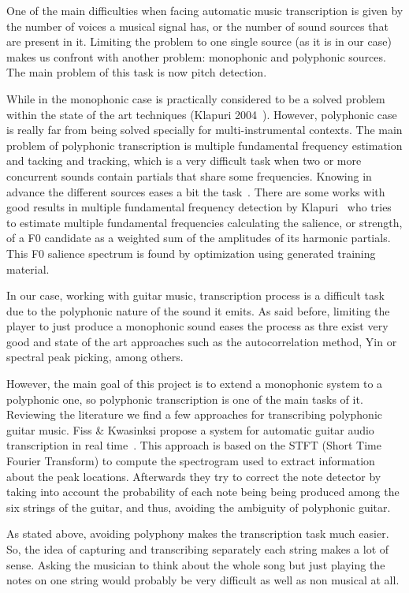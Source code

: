 One of the main difficulties when facing automatic music transcription is given by the number of voices a musical signal has, or the number of sound sources that are present in it. Limiting the problem to one single source (as it is in our case) makes us confront with another problem: monophonic and polyphonic sources. The main problem of this task is now pitch detection. 

While in the monophonic case is practically considered to be a solved problem within the state of the art techniques (Klapuri 2004~\cite{Klapuri2004}). However, polyphonic case is really far from being solved specially for multi-instrumental contexts. The main problem of polyphonic transcription is multiple fundamental frequency estimation and tacking and tracking, which is a very difficult task when two or more concurrent sounds contain partials that share some frequencies. Knowing in advance the different sources eases a bit the task~\cite{argenti2011}. There are some works with good results in multiple fundamental frequency detection by Klapuri~\cite{Klapuri2006} who tries to estimate multiple fundamental frequencies calculating the salience, or strength, of a F0 candidate as a weighted sum of the amplitudes of its harmonic partials. This F0 salience spectrum is found by optimization using generated training material.

In our case, working with guitar music, transcription process is a difficult task due to the polyphonic nature of the sound it emits.
As said before, limiting the player to just produce a monophonic sound eases the process as thre exist very good and state of the art approaches such as the autocorrelation method, Yin or spectral peak picking, among others.

However, the main goal of this project is to extend a monophonic system to a polyphonic one, so polyphonic transcription is one of the main tasks of it. Reviewing the literature we find a few approaches for transcribing polyphonic guitar music. Fiss \& Kwasinksi propose a system for automatic guitar audio transcription in real time~\cite{Fiss2011}. This approach is based on the STFT (Short Time Fourier Transform) to compute the spectrogram used to extract information about the peak locations. Afterwards they try to correct the note detector by taking into account the probability of each note being being produced among the six strings of the guitar, and thus, avoiding the ambiguity of polyphonic guitar.
 
As stated above, avoiding polyphony makes the transcription task much easier. So, the idea of capturing and transcribing separately each string makes a lot of sense. Asking the musician to think about the whole song but just playing the notes on one string would probably be very difficult as well as non musical at all. 

